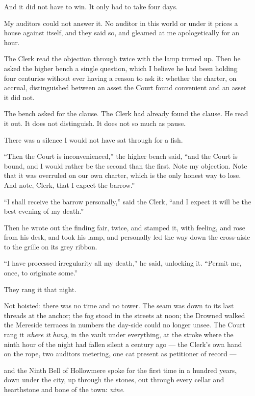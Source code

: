 And it did not have to win. It only had to take four days.

My auditors could not answer it. No auditor in this world or under it prices a house against itself, and they said so, and gleamed at me apologetically for an hour.

The Clerk read the objection through twice with the lamp turned up. Then he asked the higher bench a single question, which I believe he had been holding four centuries without ever having a reason to ask it: whether the charter, on accrual, distinguished between an asset the Court found convenient and an asset it did not.

The bench asked for the clause. The Clerk had already found the clause. He read it out. It does not distinguish. It does not so much as pause.

There was a silence I would not have sat through for a fish.

``Then the Court is inconvenienced,'' the higher bench said, ``and the Court is bound, and I would rather be the second than the first. Note my objection. Note that it was overruled on our own charter, which is the only honest way to lose. And note, Clerk, that I expect the barrow.''

``I shall receive the barrow personally,'' said the Clerk, ``and I expect it will be the best evening of my death.''

Then he wrote out the finding fair, twice, and stamped it, with feeling, and rose from his desk, and took his lamp, and personally led the way down the cross-aisle to the grille on its grey ribbon.

``I have processed irregularity all my death,'' he said, unlocking it. ``Permit me, once, to originate some.''

They rang it that night.

Not hoisted: there was no time and no tower. The seam was down to its last threads at the anchor; the fog stood in the streets at noon; the Drowned walked the Mereside terraces in numbers the day-side could no longer unsee. The Court rang it \emph{where it hung}, in the vault under everything, at the stroke where the ninth hour of the night had fallen silent a century ago --- the Clerk's own hand on the rope, two auditors metering, one cat present as petitioner of record ---

and the Ninth Bell of Hollowmere spoke for the first time in a hundred years, down under the city, up through the stones, out through every cellar and hearthstone and bone of the town: \emph{nine}.

